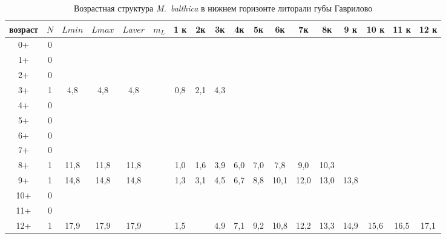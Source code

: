 \begin{landscape}
\begin{table}[h]
\caption{Возрастная структура {\it M.~balthica} в нижнем горизонте литорали губы Гаврилово}
\label{tab:Gavrilovo_ngl_growth_matrix}
\begin{tabular}{|c|c|cc|cc|cccccccccccc|}
    \hline
возраст & $N$ & $L min$ & $L max$ & $L aver$ & $m_L$   & 1 к & 2к  & 3к  & 4к  & 5к  & 6к   & 7к   & 8к   & 9 к  & 10 к & 11 к & 12 к \\ \hline
0+      & 0 &       &       &         &         &     &     &     &     &     &      &      &      &      &      &      &      \\
1+      & 0 &       &       &         &         &     &     &     &     &     &      &      &      &      &      &      &      \\
2+      & 0 &       &       &         &         &     &     &     &     &     &      &      &      &      &      &      &      \\
3+      & 1 & 4,8   & 4,8   & 4,8     &         & 0,8 & 2,1 & 4,3 &     &     &      &      &      &      &      &      &      \\
4+      & 0 &       &       &         &         &     &     &     &     &     &      &      &      &      &      &      &      \\
5+      & 0 &       &       &         &         &     &     &     &     &     &      &      &      &      &      &      &      \\
6+      & 0 &       &       &         &         &     &     &     &     &     &      &      &      &      &      &      &      \\
7+      & 0 &       &       &         &         &     &     &     &     &     &      &      &      &      &      &      &      \\
8+      & 1 & 11,8  & 11,8  & 11,8    &         & 1,0 & 1,6 & 3,9 & 6,0 & 7,0 & 7,8  & 9,0  & 10,3 &      &      &      &      \\
9+      & 1 & 14,8  & 14,8  & 14,8    &         & 1,3 & 3,1 & 4,5 & 6,7 & 8,8 & 10,1 & 12,0 & 13,0 & 13,8 &      &      &      \\
10+     & 0 &       &       &         &         &     &     &     &     &     &      &      &      &      &      &      &      \\
11+     & 0 &       &       &         &         &     &     &     &     &     &      &      &      &      &      &      &      \\
12+     & 1 & 17,9  & 17,9  & 17,9    &         & 1,5 &     & 4,9 & 7,1 & 9,2 & 10,8 & 12,2 & 13,3 & 14,9 & 15,6 & 16,5 & 17,1 \\ \hline

\end{tabular}
\end{table}
\end{landscape}
